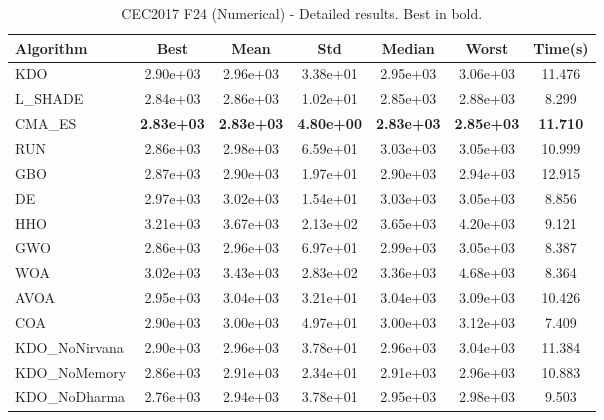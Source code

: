 \begin{table}[H]
\centering\small
\caption{CEC2017 F24 (Numerical) - Detailed results. Best in bold.}
\label{tab:cec2017_F24}
\begin{tabular}{lcccccc}
\toprule
\textbf{Algorithm} & \textbf{Best} & \textbf{Mean} & \textbf{Std} & \textbf{Median} & \textbf{Worst} & \textbf{Time(s)} \\
\midrule
KDO & 2.90e+03 & 2.96e+03 & 3.38e+01 & 2.95e+03 & 3.06e+03 & 11.476 \\
L_SHADE & 2.84e+03 & 2.86e+03 & 1.02e+01 & 2.85e+03 & 2.88e+03 & 8.299 \\
CMA_ES & \textbf{2.83e+03} & \textbf{2.83e+03} & \textbf{4.80e+00} & \textbf{2.83e+03} & \textbf{2.85e+03} & \textbf{11.710} \\
RUN & 2.86e+03 & 2.98e+03 & 6.59e+01 & 3.03e+03 & 3.05e+03 & 10.999 \\
GBO & 2.87e+03 & 2.90e+03 & 1.97e+01 & 2.90e+03 & 2.94e+03 & 12.915 \\
DE & 2.97e+03 & 3.02e+03 & 1.54e+01 & 3.03e+03 & 3.05e+03 & 8.856 \\
HHO & 3.21e+03 & 3.67e+03 & 2.13e+02 & 3.65e+03 & 4.20e+03 & 9.121 \\
GWO & 2.86e+03 & 2.96e+03 & 6.97e+01 & 2.99e+03 & 3.05e+03 & 8.387 \\
WOA & 3.02e+03 & 3.43e+03 & 2.83e+02 & 3.36e+03 & 4.68e+03 & 8.364 \\
AVOA & 2.95e+03 & 3.04e+03 & 3.21e+01 & 3.04e+03 & 3.09e+03 & 10.426 \\
COA & 2.90e+03 & 3.00e+03 & 4.97e+01 & 3.00e+03 & 3.12e+03 & 7.409 \\
KDO_NoNirvana & 2.90e+03 & 2.96e+03 & 3.78e+01 & 2.96e+03 & 3.04e+03 & 11.384 \\
KDO_NoMemory & 2.86e+03 & 2.91e+03 & 2.34e+01 & 2.91e+03 & 2.96e+03 & 10.883 \\
KDO_NoDharma & 2.76e+03 & 2.94e+03 & 3.78e+01 & 2.95e+03 & 2.98e+03 & 9.503 \\
\bottomrule
\end{tabular}
\end{table}
